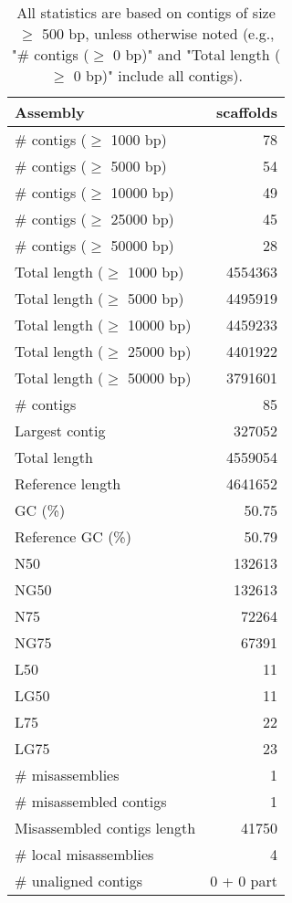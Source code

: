 \documentclass[12pt,a4paper]{article}
\begin{document}
\begin{table}[ht]
\begin{center}
\caption{All statistics are based on contigs of size $\geq$ 500 bp, unless otherwise noted (e.g., "\# contigs ($\geq$ 0 bp)" and "Total length ($\geq$ 0 bp)" include all contigs).}
\begin{tabular}{|l*{1}{|r}|}
\hline
Assembly & scaffolds \\ \hline
\# contigs ($\geq$ 1000 bp) & 78 \\ \hline
\# contigs ($\geq$ 5000 bp) & 54 \\ \hline
\# contigs ($\geq$ 10000 bp) & 49 \\ \hline
\# contigs ($\geq$ 25000 bp) & 45 \\ \hline
\# contigs ($\geq$ 50000 bp) & 28 \\ \hline
Total length ($\geq$ 1000 bp) & 4554363 \\ \hline
Total length ($\geq$ 5000 bp) & 4495919 \\ \hline
Total length ($\geq$ 10000 bp) & 4459233 \\ \hline
Total length ($\geq$ 25000 bp) & 4401922 \\ \hline
Total length ($\geq$ 50000 bp) & 3791601 \\ \hline
\# contigs & 85 \\ \hline
Largest contig & 327052 \\ \hline
Total length & 4559054 \\ \hline
Reference length & 4641652 \\ \hline
GC (\%) & 50.75 \\ \hline
Reference GC (\%) & 50.79 \\ \hline
N50 & 132613 \\ \hline
NG50 & 132613 \\ \hline
N75 & 72264 \\ \hline
NG75 & 67391 \\ \hline
L50 & 11 \\ \hline
LG50 & 11 \\ \hline
L75 & 22 \\ \hline
LG75 & 23 \\ \hline
\# misassemblies & 1 \\ \hline
\# misassembled contigs & 1 \\ \hline
Misassembled contigs length & 41750 \\ \hline
\# local misassemblies & 4 \\ \hline
\# unaligned contigs & 0 + 0 part \\ \hline

\end{tabular}
\end{center}
\end{table}
\end{document}
